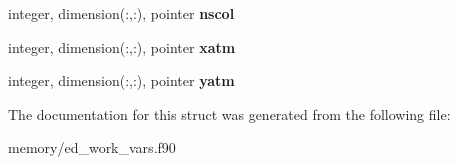 \begin{DoxyCompactItemize}
\item 
\hypertarget{structed__work__vars_1_1work__vars_aeb0696b10e8331dc7a9bcfd5c37e4e53}{
integer, dimension(:,:), pointer {\bfseries nscol}}
\label{structed__work__vars_1_1work__vars_aeb0696b10e8331dc7a9bcfd5c37e4e53}

\item 
\hypertarget{structed__work__vars_1_1work__vars_a68cfabdac07b54b2217458919ae1852c}{
integer, dimension(:,:), pointer {\bfseries xatm}}
\label{structed__work__vars_1_1work__vars_a68cfabdac07b54b2217458919ae1852c}

\item 
\hypertarget{structed__work__vars_1_1work__vars_a970493e3e9784382587fd4b3e0cc7ba2}{
integer, dimension(:,:), pointer {\bfseries yatm}}
\label{structed__work__vars_1_1work__vars_a970493e3e9784382587fd4b3e0cc7ba2}

\end{DoxyCompactItemize}


The documentation for this struct was generated from the following file:\begin{DoxyCompactItemize}
\item 
memory/ed\_\-work\_\-vars.f90\end{DoxyCompactItemize}
